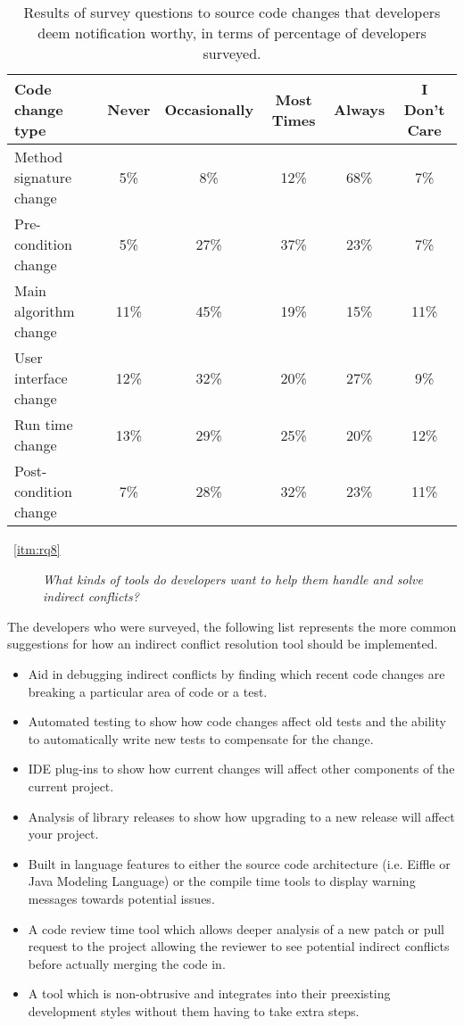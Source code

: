 \documentclass[conference]{IEEEtran}
\begin{document}
\begin{table*}[tb!]
\begin{center}
\begin{tabular}{| p{7cm} | c | c | c | c | c |}
\hline
Code change type &Never  & Occasionally & Most Times & Always & I Don't Care \\
\hline
\hline
Method signature change & 5\% & 8\% & 12\% & 68\% & 7\% \\ \hline
Pre-condition change & 5\% & 27\% & 37\% & 23\% & 7\% \\ \hline
Main algorithm change & 11\% & 45\% & 19\% & 15\% & 11\% \\ \hline
User interface change & 12\% & 32\% & 20\% & 27\% & 9\% \\ \hline
Run time change & 13\% & 29\% & 25\% & 20\% & 12\% \\ \hline
Post-condition change & 7\% & 28\% & 32\% & 23\% & 11\% \\ \hline
\end{tabular}
\end{center}
\caption{Results of survey questions to source code changes that developers deem notification worthy, in terms of percentage
of developers surveyed.\label{tab:pre}}
\end{table*}

\begin{description}
	\item[~\ref{itm:rq8}] \textit{What kinds of tools do developers want to help them handle and solve indirect conflicts?}
\end{description}

The developers who were surveyed, the following list represents the more common suggestions for how an indirect conflict
resolution tool should be implemented.

\begin{itemize}
	\item Aid in debugging indirect conflicts by finding which recent code changes are breaking a particular area of code or a test.
	\item Automated testing to show how code changes affect old tests and the ability to automatically write new tests to compensate for the change.
	\item IDE plug-ins to show how current changes will affect other components of the current project.
	\item Analysis of library releases to show how upgrading to a new release will affect your project.
	\item Built in language features to either the source code architecture (i.e. Eiffle or Java Modeling Language) or the compile time tools to display
				warning messages towards potential issues.
	\item A code review time tool which allows deeper analysis of a new patch or pull request to the project allowing the reviewer to see potential 
				indirect conflicts before actually merging the code in.
	\item A tool which is non-obtrusive and integrates into their preexisting development styles without them having to take extra steps.
\end{itemize}
\end{document}
